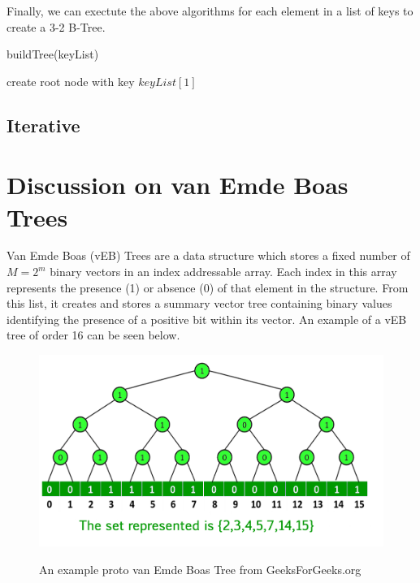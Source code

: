 \documentclass{article}
\begin{document}
\pagebreak

        Finally, we can exectute the above algorithms for each element in a list of keys to create a 3-2 B-Tree.

        \begin{function}
            \caption{buildTree(keyList)}
            \DontPrintSemicolon


            create root node with key $keyList[1]$\;

        \end{function}

    \subsection*{Iterative}

\pagebreak

\section*{Discussion on van Emde Boas Trees}

Van Emde Boas (vEB) Trees are a data structure which stores a fixed number of ${M = 2^m}$ binary vectors in an index addressable array. Each index in this array represents the presence (1) or absence (0) of that element in the structure. From this list, it creates and stores a summary vector tree containing binary values identifying the presence of a positive bit within its vector. An example of a vEB tree of order 16 can be seen below.

\begin{figure}[h]
    \centering
    \includegraphics[width=\textwidth,keepaspectratio]{Images/vEB_tree_GFG.jpg}
    \label{fig: vEB}
    \caption{An example proto van Emde Boas Tree from GeeksForGeeks.org}
\end{figure}
\end{document}

